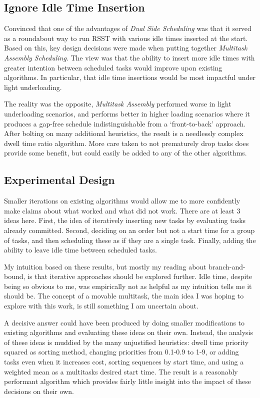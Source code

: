 \documentclass[conference]{IEEEtran}
\begin{document}
\subsection{Ignore Idle Time Insertion}

Convinced that one of the advantages of \emph{Dual Side Scheduling} was that it served as a roundabout way to run RSST with various idle times inserted at the start.
Based on this, key design decisions were made when putting together \emph{Multitask Assembly Scheduling}.
The view was that the ability to insert more idle times with greater intention between scheduled tasks would improve upon existing algorithms.
In particular, that idle time insertions would be most impactful under light underloading.

The reality was the opposite, \emph{Multitask Assembly} performed worse in light underloading scenarios, and performs better in higher loading scenarios where it produces a gap-free schedule indistinguishable from a `front-to-back' approach.
After bolting on many additional heuristics, the result is a needlessly complex dwell time ratio algorithm.
More care taken to not prematurely drop tasks does provide some benefit, but could easily be added to any of the other algorithms.

\subsection{Experimental Design}

Smaller iterations on existing algorithms would allow me to more confidently make claims about what worked and what did not work.
There are at least 3 ideas here.
First, the idea of iteratively inserting new tasks by evaluating tasks already committed.
Second, deciding on an order but not a start time for a group of tasks, and then scheduling these as if they are a single task.
Finally, adding the ability to leave idle time between scheduled tasks.

My intuition based on these results, but mostly my reading about branch-and-bound, is that iterative approaches should be explored further.
Idle time, despite being so obvious to me, was empirically not as helpful as my intuition tells me it should be.
The concept of a movable multitask, the main idea I was hoping to explore with this work, is still something I am uncertain about.

A decisive answer could have been produced by doing smaller modifications to existing algorithms and evaluating these ideas on their own.
Instead, the analysis of these ideas is muddied by the many unjustified heuristics: dwell time priority squared as sorting method, changing priorities from 0.1-0.9 to 1-9, or adding tasks even when it increases cost, sorting sequences by start time, and using a weighted mean as a multitasks desired start time.
The result is a reasonably performant algorithm which provides fairly little insight into the impact of these decisions on their own.
\end{document}
